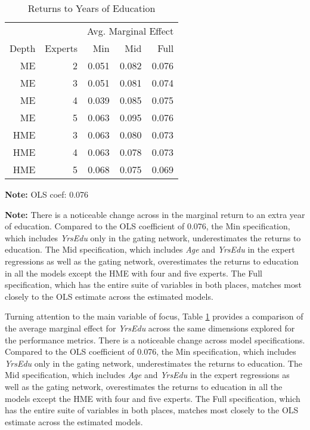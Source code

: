 \documentclass[12pt]{article}
\theoremstyle{definition}
\begin{document}
\begin{table} \centering
  \caption{Returns to Years of Education}
  \begin{threeparttable}
    \begin{tabular}[l]{r r r r r}
  \cmidrule{1-5}
        &         & \multicolumn{3}{c}{Avg. Marginal Effect} \\ 
  \cmidrule(r){3-5}
  Depth & Experts & Min   & Mid   & Full      \\
  \cmidrule{1-5}

  ME      & 2       & 0.051 & 0.082 & 0.076     \\
  ME      & 3       & 0.051 & 0.081 & 0.074     \\
  ME      & 4       & 0.039 & 0.085 & 0.075     \\
  ME      & 5       & 0.063 & 0.095 & 0.076     \\
  HME     & 3       & 0.063 & 0.080 & 0.073     \\
  HME     & 4       & 0.063 & 0.078 & 0.073     \\
  HME     & 5       & 0.068 & 0.075 & 0.069     \\

  \hline
    \end{tabular}
    \begin{tablenotes}
      \item{\footnotesize \textbf{Note:} OLS coef: 0.076}
      \item{\footnotesize \textbf{Note:} There is a noticeable change across in the marginal return to an extra year of education.
      Compared to the OLS coefficient of 0.076, the Min specification, which includes \textit{YrsEdu} only in the gating network, underestimates the returns to education.
      The Mid specification, which includes \textit{Age} and \textit{YrsEdu} in the expert regressions as well as the gating network, overestimates the returns to education in all the models except the HME with four and five experts.
      The Full specification, which has the entire suite of variables in both places, matches most closely to the OLS estimate across the estimated models.}
    \end{tablenotes} \label{tbl:YrsEdu_coef}
  \end{threeparttable}
\end{table}

\bigskip

Turning attention to the main variable of focus, Table \ref{tbl:YrsEdu_coef} provides a 
comparison of the average marginal effect for \textit{YrsEdu} across the same dimensions
explored for the performance metrics. There is a noticeable change across model specifications.
Compared to the OLS coefficient of 0.076, the Min specification,
which includes \textit{YrsEdu} only in the gating network, underestimates the returns
to education. The Mid specification, which includes \textit{Age} and
\textit{YrsEdu} in the expert regressions as well as the gating network,
overestimates the returns to education in all the models except the HME with four
and five experts. The Full specification, which has the entire suite of
variables in both places, matches most closely to the OLS estimate across the estimated
models.
\end{document}
